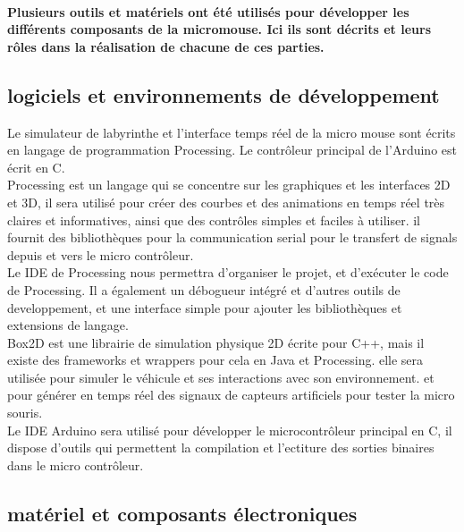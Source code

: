 \paragraph{
   Plusieurs outils et matériels ont été utilisés pour développer les différents composants
de la micromouse. Ici ils sont décrits et leurs rôles dans la réalisation de chacune de ces parties.}

\subsection{logiciels et environnements de développement} \label{subsec:softDev}
   
   Le simulateur de labyrinthe et l'interface temps réel de la micro mouse sont écrits en
langage de programmation Processing. Le contrôleur principal de l'Arduino est
écrit en C. \\

   Processing est un langage qui se concentre sur les graphiques et les interfaces 2D et 3D,
il sera utilisé pour créer des courbes et des animations en temps réel très claires et 
informatives, ainsi que des contrôles simples et faciles à utiliser. il fournit des 
bibliothèques pour la communication serial pour le transfert de signals depuis et vers le
micro contrôleur. \\


   Le IDE de Processing nous permettra d'organiser le projet, et d'exécuter le code de Processing.
Il a également un débogueur intégré et d'autres outils de developpement, et une interface simple pour
ajouter les bibliothèques et extensions de langage. \\


   Box2D est une librairie de simulation physique 2D écrite pour C++, mais il existe des frameworks
et wrappers pour cela en Java et Processing. elle sera utilisée pour simuler le véhicule et ses
interactions avec son environnement. et pour générer en temps réel des signaux de capteurs
artificiels pour tester la micro souris. \\


   Le IDE Arduino sera utilisé pour développer le microcontrôleur principal en
C, il dispose d'outils qui permettent la compilation et l'ectiture des sorties
binaires dans le micro contrôleur. \\

\subsection{matériel et composants électroniques} \label{subsec:hardDev}


